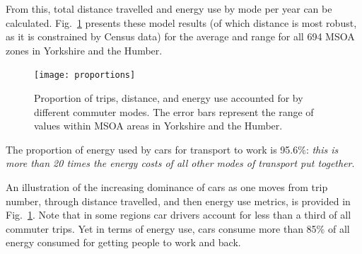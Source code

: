 From this, total distance travelled and
energy use by mode per year can be calculated.
Fig.~\ref{fig:proportions} presents these model
results (of which distance is most robust, as it is constrained by Census data)
for the average and range for all 694 MSOA zones in Yorkshire and the Humber.

\begin{figure}[h*]
 \centering
\texttt{[image: proportions]}
 \caption[Proportion of trips, distance, and energy by mode]
 {Proportion of trips, distance, and energy use accounted for by
different commuter modes. The error bars represent the range of values within
MSOA areas in Yorkshire and the Humber.}
 \label{fig:proportions}
\end{figure}

The proportion of energy
used by cars for transport to work is 95.6\%: \emph{this is more than 20 times
the energy costs of all other modes of transport put together}.

An illustration of the increasing dominance of cars as one moves from trip
number, through distance travelled, and then energy use metrics, is provided in
Fig.~\ref{fig:proportions}. Note that in some regions car drivers account for
less than a third of all commuter trips. Yet in terms of energy use, cars
consume more than 85\% of all energy consumed for getting people to work and
back.


